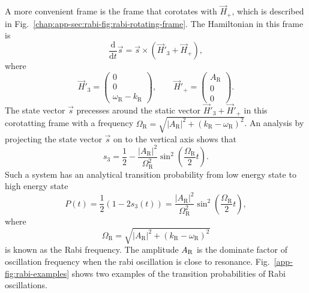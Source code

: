 


A more convenient frame is the frame that corotates with $\vec{H}_+$, which is described in Fig.~\ref{chap:app-sec:rabi-fig:rabi-rotating-frame}. The Hamiltonian in this frame is
\begin{equation}
\frac{\mathrm d}{\mathrm d t } \vec{s} = \vec{s} \times (\vec{H}'_3 + \vec{H}_+),
\end{equation}
where
\begin{equation}
\vec{H}'_3 = \begin{pmatrix}
    0 \\ 0 \\ 　\omega_{\mathrm{R}} - k_{\mathrm R}
  \end{pmatrix}, \qquad \vec{H}'_+ = \begin{pmatrix}
    A_{\mathrm{R}} \\ 0 \\ 　0
    \end{pmatrix}.
\end{equation}
The state vector $\vec{s}$ precesses around the static vector $\vec{H}'_3 + \vec{H}'_+$ in this corotatting frame with a frequency $\Omega_{\mathrm R} = \sqrt{ \lvert A_{\mathrm{R}}\rvert^2 + (k_{\mathrm{R}} - \omega_{\mathrm R})^2 }$. An analysis by projecting the state vector $\vec{s}$ on to the vertical axis shows that
\begin{equation}
s_3 = \frac{1}{2} - \frac{\lvert A_{\mathrm R}\rvert ^2}{\Omega_{\mathrm R}^2}\sin^2\left(\frac{\Omega_{\mathrm R}}{2} t\right).
\end{equation}
Such a system has an analytical transition probability from low energy state to high energy state
\begin{equation}
    P(t) = \frac{1}{2}(1- 2 s_3(t))= \frac{\left \lvert A_{\mathrm{R}} \right \rvert ^2}{ \Omega_{\mathrm R}^2 } \sin^2 \left( \frac{\Omega_{\mathrm R}}{2} t \right),
    \label{rabi-system-transition-probability}
\end{equation}
where
\begin{equation}
\Omega_{\mathrm R} = \sqrt{ \lvert A_{\mathrm{R}}\rvert^2 + (k_{\mathrm{R}} - \omega_{\mathrm R})^2 }
\end{equation} is known as the Rabi frequency. The amplitude $A_\mathrm R$ is the dominate factor of oscillation frequency when the rabi oscillation is close to resonance. Fig.~\ref{app-fig:rabi-examples} shows two examples of the transition probabilities of Rabi oscillations.

